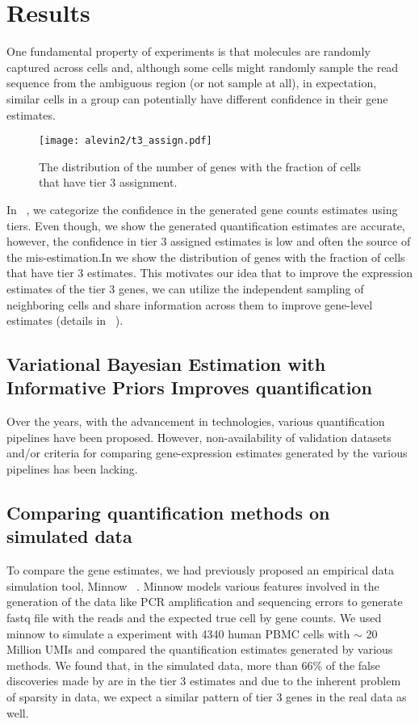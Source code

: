 \section{Results}
One fundamental property of \dscrnaseq experiments is that molecules are randomly captured across cells 
and, although some cells might randomly sample the read sequence from the ambiguous region 
(or not sample at all), in expectation, similar cells in a group can potentially have different 
confidence in their gene estimates. 

\begin{figure}[!htb]
    \centering
    \texttt{[image: alevin2/t3\_assign.pdf]}
    \caption{ The distribution of the number of genes with the fraction of cells that have tier 3
    assignment.}
    \label{fig:alv2_t3}
\end{figure}

In ~, we categorize the confidence in the generated gene counts estimates using tiers. 
Even though, we show the \alevin generated quantification estimates are accurate, however, the confidence 
in tier 3 assigned estimates is low and often the source of the mis-estimation.In  we show the 
distribution of genes with the fraction of cells that have tier 3 estimates. This motivates our idea that to improve 
the expression estimates of the tier 3 genes, we can utilize the independent sampling of neighboring cells and share 
information across them to improve gene-level estimates (details in ~).

\subsection{Variational Bayesian Estimation with Informative Priors Improves \dscrnaseq quantification}
Over the years, with the advancement in \singlecell technologies, various \singlecell quantification 
pipelines have been proposed. However, non-availability of validation datasets and/or criteria for 
comparing gene-expression estimates generated by the various pipelines has been lacking. 

\subsection{Comparing quantification methods on simulated data}
\label{subsec:alv2_sims}

To compare the gene estimates, we had previously proposed an empirical \dscrnaseq data simulation tool, Minnow 
~\citep{sarkar2019minnow}. Minnow models various features involved in the generation of the \dscrnaseq data 
like PCR amplification and sequencing errors to generate fastq file with the reads and the expected true cell 
by gene counts. We used minnow to simulate a \dscrnaseq experiment with 4340 human PBMC cells with $\sim$ 
20 Million UMIs and compared the quantification estimates generated by various methods. We found that, 
in the simulated data, more than 66\% of the false discoveries made by \alevin are in the tier 3 estimates 
and due to the inherent problem of sparsity in \dscrnaseq data, we expect a similar pattern of tier 3 genes in 
the real data as well.


